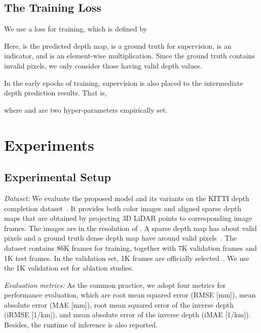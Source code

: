 \documentclass[letterpaper, 10 pt, conference]{ieeeconf}
\begin{document}
\subsection{The Training Loss}
We use a  loss for training, which is defined by

Here,  is the predicted depth map,  is a ground truth for supervision,  is an indicator, and  is an element-wise multiplication. Since the ground truth contains invalid pixels, we only consider those having valid depth values. 

In the early epochs of training, supervision is also placed to the intermediate depth prediction results. That is,

where  and  are two hyper-parameters empirically set. 


\section{Experiments}
\subsection{Experimental Setup}
\textit{Dataset:} We evaluate the proposed model and its variants on the KITTI depth completion dataset~\cite{KITTI,Uhrig2017sparsity}. It provides both color images and aligned sparse depth maps that are obtained by projecting 3D LiDAR points to corresponding image frames. The images are in the resolution of . A sparse depth map has about  valid pixels and a ground truth dense depth map have around  valid pixels~\cite{Uhrig2017sparsity}. The dataset contains 86K frames for training, together with 7K validation frames and 1K test frames. In the validation set, 1K frames are officially selected~\cite{KITTI,Uhrig2017sparsity}. We use the 1K validation set for ablation studies. 




\textit{Evaluation metrics:} As the common practice, we adopt four metrics for performance evaluation, which are root mean squared error (RMSE [mm]), mean absolute error (MAE [mm]), root mean squared error of the inverse depth (iRMSE [1/km]), and mean absolute error of the inverse depth (iMAE [1/km]). Besides, the runtime of inference is also reported. 
\end{document}
